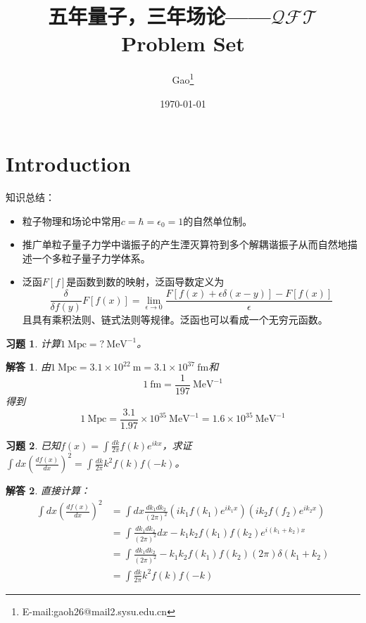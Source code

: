 \documentclass[a4paper,11pt]{ctexart}
\title{五年量子，三年场论——$\mathcal{QFT}$ Problem Set}
\author{Gao\thanks{E-mail:gaoh26@mail2.sysu.edu.cn}}
\date{\today}
\newtheorem{ex}{习题}[section]
\newtheorem{ans}{解答}[section]
\newcommand{\beq}{\begin{equation}}
\newcommand{\eeq}{\end{equation}}
\newcommand{\bea}{\begin{equation}\begin{aligned}}
\newcommand{\eea}{\end{aligned}\end{equation}}
\newcommand{\mev}{\ \mathrm{MeV}}
\begin{document}
\maketitle
\tableofcontents
\newpage
\section{Introduction}
知识总结：
\begin{itemize}
\item 粒子物理和场论中常用$c = \hbar = \epsilon_0 = 1$的自然单位制。
\item 推广单粒子量子力学中谐振子的产生湮灭算符到多个解耦谐振子从而自然地描述一个多粒子量子力学体系。
\item 泛函$F[f]$是函数到数的映射，泛函导数定义为
\beq
\frac{\delta}{\delta f(y)}F[f(x)] = \lim_{\epsilon \to 0} \frac{F[f(x) + \epsilon \delta(x-y)] - F[f(x)]}{\epsilon}
\eeq
且具有乘积法则、链式法则等规律。泛函也可以看成一个无穷元函数。
\end{itemize}
\begin{ex}
计算$1\ \mathrm{Mpc} = ? \mev^{-1}$。
\end{ex}
\begin{ans}
由$1\ \mathrm{Mpc} = 3.1\times 10^{22}\ \mathrm{m} = 3.1\times 10^{37}\ \mathrm{fm}$和
\beq
1\mathrm{\ fm} = \frac{1}{197} \mev^{-1}
\eeq
得到
\beq
1\ \mathrm{Mpc} = \frac{3.1}{1.97} \times 10^{35} \mev^{-1} = 1.6\times 10^{35} \mev^{-1}
\eeq
\end{ans}

\begin{ex}
已知$f(x) = \int \frac{dk}{2\pi} f(k) e^{ikx}$，求证$\int dx \left(\frac{df(x)}{dx}\right)^2 = \int \frac{dk}{2\pi} k^2 f(k) f(-k)$。
\end{ex}
\begin{ans}
直接计算：
\bea
\int dx \left(\frac{df(x)}{dx}\right)^2 &= \int dx \frac{dk_1 dk_2}{(2\pi)^2} \left(ik_1 f(k_1) e^{ik_1 x}\right) \left(ik_2 f(f_2)e^{ik_2x}\right)\\
&= \int \frac{dk_1dk_2}{(2\pi)^2} dx -k_1k_2 f(k_1)f(k_2) e^{i(k_1+k_2) x} \\
&= \int \frac{dk_1 dk_2}{(2\pi)^2} -k_1 k_2 f(k_1) f(k_2) (2\pi) \delta(k_1 + k_2) \\
&= \int \frac{dk}{2\pi} k^2 f(k) f(-k)
\eea
\end{ans}
\end{document}
